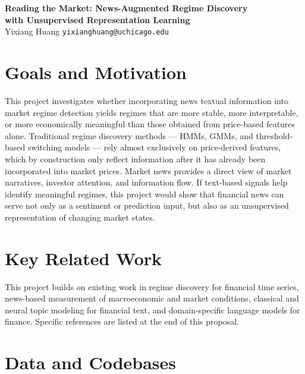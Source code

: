 \documentclass[12pt, letterpaper]{article}
\begin{document}
\begin{center}
    {\large\bfseries Reading the Market: News-Augmented Regime Discovery\\[0.2em]
    with Unsupervised Representation Learning}\\[0.4em]
    {\normalsize Yixiang Huang \quad \texttt{yixianghuang@uchicago.edu}}
\end{center}



\section{Goals and Motivation}

This project investigates whether incorporating news textual information into market regime detection yields regimes that are more stable, more interpretable, or more economically meaningful than those obtained from price-based features alone.
Traditional regime discovery methods --- HMMs, GMMs, and threshold-based switching models --- rely almost exclusively on price-derived features, which by construction only reflect information after it has already been incorporated into market prices.
Market news provides a direct view of market narratives, investor attention, and information flow.
If text-based signals help identify meaningful regimes, this project would show that financial news can serve not only as a sentiment or prediction input, but also as an unsupervised representation of changing market states.

\section{Key Related Work}

This project builds on existing work in regime discovery for financial time series, news-based measurement of macroeconomic and market conditions, classical and neural topic modeling for financial text, and domain-specific language models for finance. Specific references are listed at the end of this proposal.

\section{Data and Codebases}
\end{document}
